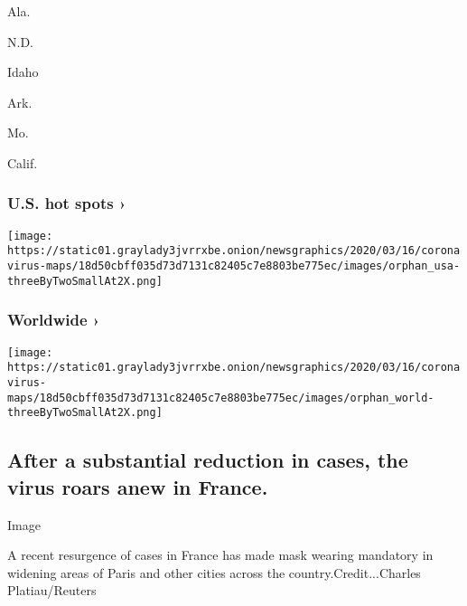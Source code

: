 Ala.
\href{https://www.nytimes3xbfgragh.onion/interactive/2020/us/north-dakota-coronavirus-cases.html}{}

N.D.
\href{https://www.nytimes3xbfgragh.onion/interactive/2020/us/idaho-coronavirus-cases.html}{}

Idaho
\href{https://www.nytimes3xbfgragh.onion/interactive/2020/us/arkansas-coronavirus-cases.html}{}

Ark.
\href{https://www.nytimes3xbfgragh.onion/interactive/2020/us/missouri-coronavirus-cases.html}{}

Mo.
\href{https://www.nytimes3xbfgragh.onion/interactive/2020/us/california-coronavirus-cases.html}{}

Calif.

\href{https://www.nytimes3xbfgragh.onion/interactive/2020/us/coronavirus-us-cases.html}{}

\hypertarget{us-hot-spots-}{%
\subsubsection{U.S. hot spots ›}\label{us-hot-spots-}}

\texttt{[image: https://static01.graylady3jvrrxbe.onion/newsgraphics/2020/03/16/coronavirus-maps/18d50cbff035d73d7131c82405c7e8803be775ec/images/orphan\_usa-threeByTwoSmallAt2X.png]}
\href{https://www.nytimes3xbfgragh.onion/interactive/2020/world/coronavirus-maps.html}{}

\hypertarget{worldwide-}{%
\subsubsection{Worldwide ›}\label{worldwide-}}

\texttt{[image: https://static01.graylady3jvrrxbe.onion/newsgraphics/2020/03/16/coronavirus-maps/18d50cbff035d73d7131c82405c7e8803be775ec/images/orphan\_world-threeByTwoSmallAt2X.png]}

\hypertarget{after-a-substantial-reduction-in-cases-the-virus-roars-anew-in-france}{%
\subsection{After a substantial reduction in cases, the virus roars anew
in
France.}\label{after-a-substantial-reduction-in-cases-the-virus-roars-anew-in-france}}

Image

A recent resurgence of cases in France has made mask wearing mandatory
in widening areas of Paris and other cities across the
country.Credit...Charles Platiau/Reuters

